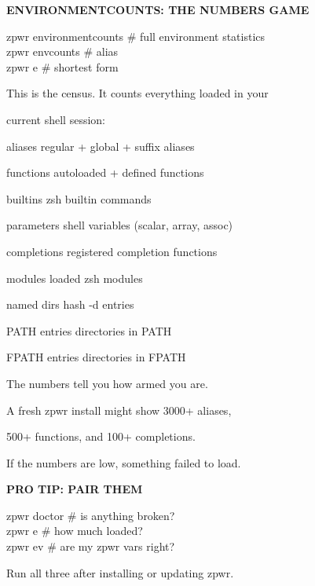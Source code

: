 \documentclass[11pt,a4paper,twoside]{book}
\begin{document}
\vspace{12pt}
{\bfseries\color{neonyellow} ENVIRONMENTCOUNTS: THE NUMBERS GAME}\vspace{4pt}

\begin{codebox}
zpwr environmentcounts              \# full environment statistics\\
zpwr envcounts                      \# alias\\
zpwr e                               \# shortest form\\
\end{codebox}

This is the census. It counts everything loaded in your

current shell session:

aliases         regular + global + suffix aliases

functions       autoloaded + defined functions

builtins        zsh builtin commands

parameters      shell variables (scalar, array, assoc)

completions     registered completion functions

modules         loaded zsh modules

named dirs      hash -d entries

PATH entries    directories in PATH

FPATH entries   directories in FPATH

The numbers tell you how armed you are.

A fresh zpwr install might show 3000+ aliases,

500+ functions, and 100+ completions.

If the numbers are low, something failed to load.


\vspace{12pt}
{\bfseries\color{neonyellow} PRO TIP: PAIR THEM}\vspace{4pt}

\begin{codebox}
zpwr doctor                   \# is anything broken?\\
zpwr e                         \# how much loaded?\\
zpwr ev                        \# are my zpwr vars right?\\
\end{codebox}

Run all three after installing or updating zpwr.
\end{document}
